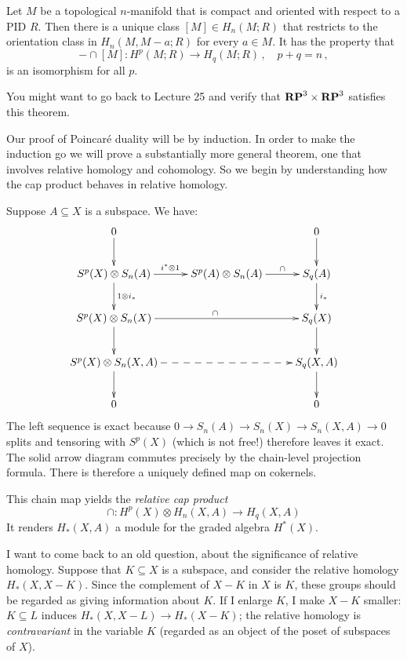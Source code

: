 \begin{theorem}
Let $M$ be a topological $n$-manifold that is compact and oriented with 
respect to a PID $R$. Then there is a unique class $[M]\in H_n(M;R)$ that
restricts to the orientation class in $H_n(M,M-a;R)$ for every $a\in M$. 
It has the property that
\[
-\cap[M]:H^p(M;R)\to H_q(M;R)\,,\quad p+q=n\,,
\]
is an isomorphism for all $p$.
\end{theorem}

You might want to go back to Lecture 25 and verify that $\mathbf{RP}^3\times\mathbf{RP}^3$
satisfies this theorem. 

Our proof of Poincar\'e duality will be by induction. In order to make the
induction go we will prove a substantially more general theorem, one that
involves relative homology and cohomology. So we begin by understanding
how the cap product behaves in relative homology.

Suppose $A\subseteq X$ is a subspace. We have:
\begin{equation*}
\xymatrix{
	0\ar[d] & & 0\ar[d]\\
	S^p(X)\otimes S_n(A)\ar[d]^{1\otimes i_\ast}\ar[r]^{i^\ast\otimes 1} & S^p(A)\otimes S_n(A)\ar[r]^-{\cap} & S_q(A)\ar[d]^{i_*}\\
	S^p(X)\otimes S_n(X)\ar[rr]^\cap\ar[d] & & S_q(X)\ar[d]\\
	S^p(X)\otimes S_n(X,A)\ar[d]\ar@{-->}[rr] & & S_q(X,A)\ar[d]\\
	0 & & 0
}
\end{equation*}
The left sequence is exact because $0\to S_n(A)\to S_n(X)\to S_n(X,A)\to 0$ splits and tensoring with $S^p(X)$ (which is not free!) therefore leaves it exact. The solid arrow diagram commutes precisely by the chain-level projection formula. There is therefore a uniquely defined map on cokernels.

This chain map yields the {\em relative cap product}
\[
\cap: H^p(X)\otimes H_n(X,A)\to H_q(X,A)
\]
It renders $ H_\ast(X,A)$ a module for the graded algebra $ H^\ast(X)$.


I want to come back to an old question, about the significance of 
relative homology. Suppose that $K\subseteq X$ is a subspace, and consider the
relative homology $H_*(X,X-K)$. Since the complement of $X-K$ in $X$ is $K$,
these groups should be regarded as giving information about $K$. If I enlarge
$K$, I make $X-K$ smaller: $K\subseteq L$ induces
$H_*(X,X-L)\to H_*(X-K)$; the relative homology is {\em contravariant}
in the variable $K$ (regarded as an object of the poset of subspaces of $X$). 

